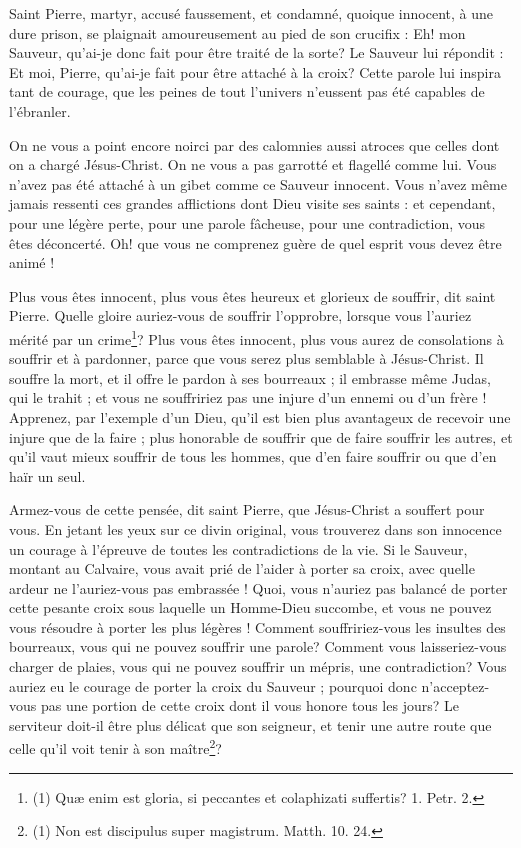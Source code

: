 \documentclass[instructions.tex]{subfiles}
\begin{document}
Saint Pierre, martyr, accusé faussement, et condamné, quoique innocent, à une dure prison, se plaignait amoureusement au pied de son crucifix : Eh! mon Sauveur, qu’ai-je donc fait pour être traité de la sorte? Le Sauveur lui répondit : Et moi, Pierre, qu’ai-je fait pour être attaché à la croix? Cette parole lui inspira tant de courage, que les peines de tout l’univers n’eussent pas été capables de l’ébranler.
 
On ne vous a point encore noirci par des calomnies aussi atroces que celles dont on a chargé Jésus-Christ. On ne vous a pas garrotté et flagellé comme lui. Vous n’avez pas été attaché à un gibet comme ce Sauveur innocent. Vous n’avez même jamais ressenti ces grandes afflictions dont Dieu visite ses saints : et cependant, pour une légère perte, pour une parole fâcheuse, pour une contradiction, vous êtes déconcerté. Oh! que vous ne comprenez guère de quel esprit vous devez être animé !
 
Plus vous êtes innocent, plus vous êtes heureux et glorieux de souffrir, dit saint Pierre. Quelle gloire auriez-vous de souffrir l’opprobre, lorsque vous l’auriez mérité par un crime\footnote{(1) Quæ enim est gloria, si peccantes et colaphizati suffertis? 1. Petr. 2.}? Plus vous êtes innocent, plus vous aurez de consolations à souffrir et à pardonner, parce que vous serez plus semblable à Jésus-Christ. Il souffre la mort, et il offre le pardon à ses bourreaux ; il embrasse même Judas, qui le trahit ; et vous ne souffririez pas une injure d’un ennemi ou d’un frère ! Apprenez, par l’exemple d’un Dieu, qu’il est bien plus avantageux de recevoir une injure que de la faire ; plus honorable de souffrir que de faire souffrir les autres, et qu’il vaut mieux souffrir de tous les hommes, que d’en faire souffrir ou que d’en haïr un seul.
 
Armez-vous de cette pensée, dit saint Pierre, que Jésus-Christ a souffert pour vous. En jetant les yeux sur ce divin original, vous trouverez dans son innocence un courage à l’épreuve de toutes les contradictions de la vie. Si le Sauveur, montant au Calvaire, vous avait prié de l’aider à porter sa croix, avec quelle ardeur ne l’auriez-vous pas embrassée ! Quoi, vous n’auriez pas balancé de porter cette pesante croix sous laquelle un Homme-Dieu succombe, et vous ne pouvez vous résoudre à porter les plus légères ! Comment souffririez-vous les insultes des bourreaux, vous qui ne pouvez souffrir une parole? Comment vous laisseriez-vous charger de plaies, vous qui ne pouvez souffrir un mépris, une contradiction? Vous auriez eu le courage de porter la croix du Sauveur ; pourquoi donc n’acceptez-vous pas une portion de cette croix dont il vous honore tous les jours? Le serviteur doit-il être plus délicat que son seigneur, et tenir une autre route que celle qu’il voit tenir à son maître\footnote{(1) Non est discipulus super magistrum. Matth. 10. 24.}?
 
\end{document}
